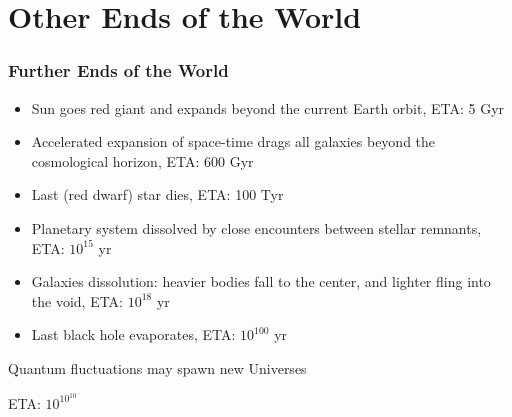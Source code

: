 \documentclass[aspectratio=169]{beamer}
\begin{document}
\section{Other Ends of the World}
\begin{frame}
\frametitle{Further Ends of the World}
\begin{itemize}
\item Sun goes red giant and expands beyond the current Earth orbit, ETA: 5 Gyr
\item Accelerated expansion of space-time drags all galaxies beyond the cosmological horizon, ETA: 600 Gyr
\item Last (red dwarf) star dies, ETA: 100 Tyr
\item Planetary system dissolved by close encounters between stellar remnants, ETA: $10^{15}$ yr
\item Galaxies dissolution: heavier bodies fall to the center, and lighter fling into the void, ETA: $10^{18}$ yr
\item Last black hole evaporates, ETA: $10^{100}$ yr
\end{itemize}
\end{frame}

\begin{frame}
\Large{\centerline{Quantum fluctuations may spawn new Universes}}
\Large{\centerline{ETA: $10^{10^{10^{\ldots}}}$}}
\end{frame}
\end{document}
